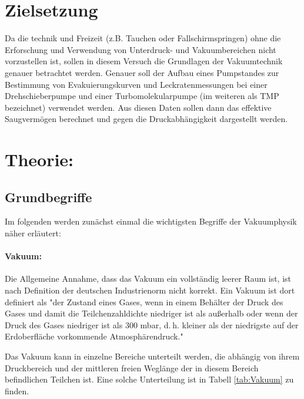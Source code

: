 \section{Zielsetzung}
\label{sec:Zielsetzung}
Da die technik und Freizeit (z.B. Tauchen oder Fallschirmspringen) ohne die Erforschung und Verwendung von Unterdruck- und Vakuumbereichen nicht vorzustellen
ist, sollen in diesem Versuch die Grundlagen der Vakuumtechnik genauer betrachtet werden.
Genauer soll der Aufbau eines Pumpstandes zur Bestimmung von Evakuierungskurven und Leckratenmessungen
bei einer Drehschieberpumpe und einer Turbomolekularpumpe (im weiteren als TMP bezeichnet) verwendet werden.
Aus diesen Daten sollen dann das effektive Saugvermögen berechnet und gegen die Druckabhängigkeit dargestellt werden.


\section{Theorie:}
\label{sec:Theorie}
\subsection{Grundbegriffe}

Im folgenden werden zunächst einmal die wichtigsten Begriffe der Vakuumphysik näher erläutert:
\paragraph{Vakuum:}
Die Allgemeine Annahme, dass das Vakuum ein vollständig leerer Raum ist, ist nach Definition der
deutschen Industrienorm nicht korrekt.
Ein Vakuum ist dort definiert als "der Zustand eines Gases, wenn in einem Behälter der
Druck des Gases und damit die Teilchenzahldichte niedriger ist als außerhalb oder wenn der Druck
des Gases niedriger ist als 300 mbar, d. h. kleiner als der niedrigste auf der Erdoberfläche
vorkommende Atmosphärendruck."\cite{vakuum}

Das Vakuum kann in einzelne Bereiche unterteilt werden, die abhängig von ihrem Druckbereich und der mittleren
freien Weglänge der in diesem Bereich befindlichen Teilchen ist. Eine solche Unterteilung ist in Tabell \ref{tab:Vakuum}
zu finden.

